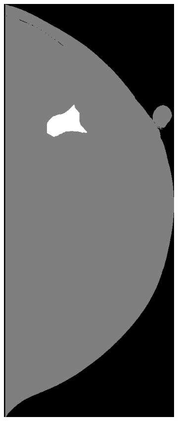 \documentclass{beamer}
\begin{document}
\begin{frame}
\begin{figure}
\begin{subfigure}{0.134\textwidth}
            \end{subfigure}
            \begin{subfigure}{0.134\textwidth}
	            \centering
		            \includegraphics[width=\textwidth]{plots/examples/label_2.png}

\end{subfigure}
\end{figure}
\end{frame}
\end{document}
